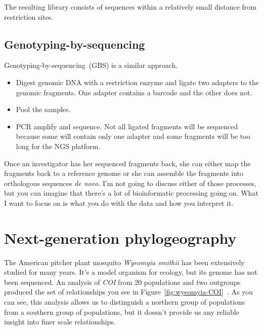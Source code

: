 \documentclass[12pt]{article}
\begin{document}
\noindent The resulting library consists of sequences within a
relatively small distance from restriction sites.

\subsection*{Genotyping-by-sequencing}

Genotyping-by-sequencing~(GBS) is a similar approach. 

\begin{itemize}

\item Digest genomic DNA with a restriction enzyme and ligate two
  adapters to the genomic fragments. One adapter contains a barcode
  and the other does not.

\item Pool the samples.

\item PCR amplify and sequence. Not all ligated fragments will be
  sequenced because some will contain only one adapter and some
  fragments will be too long for the NGS platform.

\end{itemize}

\noindent Once an investigator has her sequenced fragments back, she
can either map the fragments back to a reference genome or she can
assemble the fragments into orthologous sequences {\it de novo}. I'm
not going to discuss either of those processes, but you can imagine
that there's a lot of bioinformatic processing going on. What I want
to focus on is what you do with the data and how you interpret it.

\section*{Next-generation phylogeography}

The American pitcher plant mosquito {\it Wyeomyia
  smithii\/} has been extensively studied for many years. It's a model
organism for ecology, but its genome has not been sequenced. An
analysis of {\it COI} from 20 populations and two outgroups produced
the set of relationships you see in
Figure~\ref{fig:wyeomyia-COI}~\cite{Emerson-etal-2010}.
As you can see, this analysis allows us to distinguish a northern
group of populations from a southern group of populations, but it
doesn't provide us any reliable insight into finer scale
relationships. 
\end{document}
